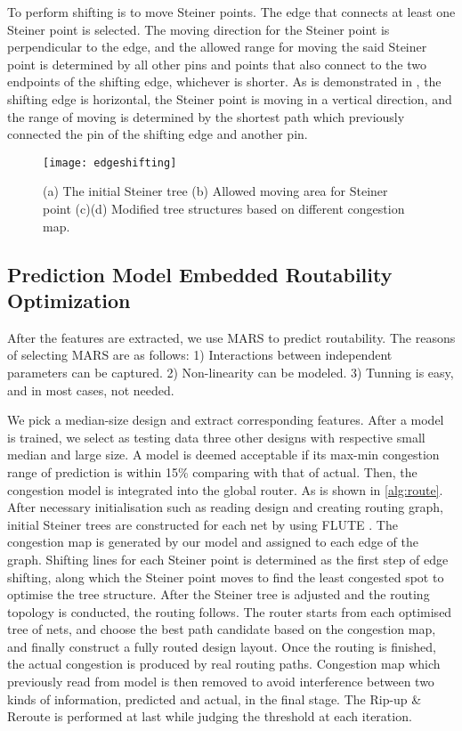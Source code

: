 To perform shifting is to move Steiner points. The edge that connects at least one Steiner point is selected. The moving direction for the Steiner point is perpendicular to the edge, and the allowed range for moving the said Steiner point is determined by all other pins and points that also connect to the two endpoints of the shifting edge, whichever is shorter. As is demonstrated in , the shifting edge is horizontal, the Steiner point is moving in a vertical direction, and the range of moving is determined by the shortest path which previously connected the pin of the shifting edge and another pin. 
\begin{figure}[htbp]
    \centerline{\texttt{[image: edgeshifting]}}
    \caption{(a) The initial Steiner tree (b) Allowed moving area for Steiner point (c)(d) Modified tree structures based on different congestion map.}
    \label{fig:edgeshifting}
\end{figure}

\subsection{Prediction Model Embedded Routability Optimization}
After the features are extracted, we use MARS \cite{MARS} to predict routability. The reasons of selecting MARS are as follows: 1) Interactions between independent parameters can be captured. 2) Non-linearity can be modeled. 3) Tunning is easy, and in most cases, not needed. 

We pick a median-size design and extract corresponding features.
After a model is trained, we select as testing data three other designs with respective small median and large size.
A model is deemed acceptable if its max-min congestion range of prediction is within 15\% comparing with that of actual.
Then, the congestion model is integrated into the global router.
As is shown in \ref{alg:route}.
After necessary initialisation such as reading design and creating routing graph, initial Steiner trees are constructed for each net by using FLUTE \cite{FLUTE}.
The congestion map is generated by our model and assigned to each edge of the graph.
Shifting lines for each Steiner point is determined as the first step of edge shifting, along which the Steiner point moves to find the least congested spot to optimise the tree structure.
After the Steiner tree is adjusted and the routing topology is conducted, the routing follows. The router starts from each optimised tree of nets, and choose the best path candidate based on the congestion map, and finally construct a fully routed design layout.
Once the routing is finished, the actual congestion is produced by real routing paths. Congestion map which previously read from model is then removed to avoid interference between two kinds of information, predicted and actual, in the final stage.
The Rip-up \& Reroute is performed at last while judging the threshold at each iteration.


